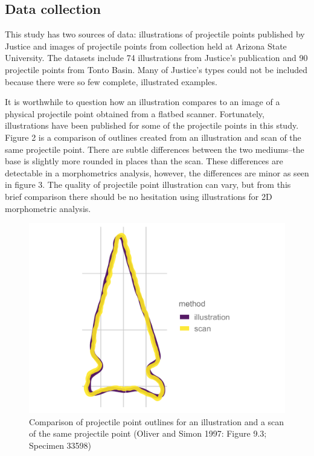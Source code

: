 \documentclass[a4paper]{article}
\begin{document}
\hypertarget{data-collection}{%
\subsection*{Data collection}\label{data-collection}}

This study has two sources of data: illustrations of projectile points published by Justice \autocite*{Justice2002-cf} and images of projectile points from collection held at Arizona State University. The datasets include 74 illustrations from Justice's publication and 90 projectile points from Tonto Basin. Many of Justice's types could not be included because there were so few complete, illustrated examples.

It is worthwhile to question how an illustration compares to an image of a physical projectile point obtained from a flatbed scanner. Fortunately, illustrations have been published for some of the projectile points in this study. Figure 2 is a comparison of outlines created from an illustration and scan of the same projectile point. There are subtle differences between the two mediums--the base is slightly more rounded in places than the scan. These differences are detectable in a morphometrics analysis, however, the differences are minor as seen in figure 3. The quality of projectile point illustration can vary, but from this brief comparison there should be no hesitation using illustrations for 2D morphometric analysis.

\begin{figure}
\includegraphics[width=1\linewidth]{figures/pointComparison} \caption{Comparison of projectile point outlines for an illustration and a scan of the same projectile point (Oliver and Simon 1997: Figure 9.3; Specimen 33598)}\label{fig:pointComparison}
\end{figure}
\end{document}
